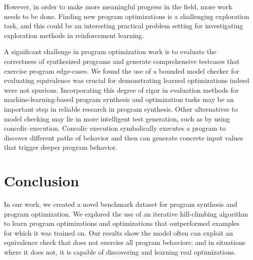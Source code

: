 \documentclass{article}
\begin{document}
However, in order to make more meaningful progress in the field, more work needs to be done. Finding new program optimizations is a challenging exploration task, and this could be an interesting practical problem setting for investigating exploration methods in reinforcement learning. 

A significant challenge in program optimization work is to evaluate the correctness of synthesized programs and generate comprehensive testcases that exercise program edge-cases. We found the use of a bounded model checker for evaluating equivalence was crucial for demonstrating learned optimizations indeed were not spurious. Incorporating this degree of rigor in evaluation methods for machine-learning-based program synthesis and optimization tasks may be an important step in reliable research in program synthesis. Other alternatives to model checking may lie in more intelligent test generation, such as by using concolic execution.  Concolic execution symbolically executes a program to discover different paths of behavior and then can generate concrete input values that trigger deeper program behavior. 


\section{Conclusion}

In our work, we created a novel benchmark dataset for program synthesis and program optimization. We explored the use of an iterative hill-climbing algorithm to learn program optimizations and optimizations that outperformed examples for which it was trained on. Our results show the model often can exploit an equivalence check that does not exercise all program behaviors; and in situations where it does not, it is capable of discovering and learning real optimizations. 




\end{document}

